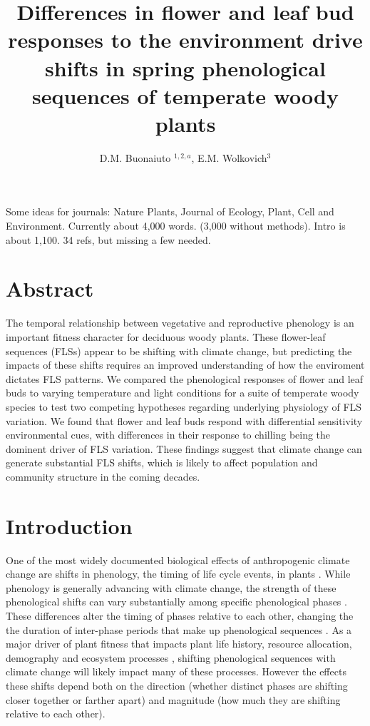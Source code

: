 \documentclass[11pt]{article}
\title{Differences in flower and leaf bud responses to the environment drive shifts in spring phenological sequences of temperate woody plants}\\
\date{}
\author{D.M. Buonaiuto $^{1,2,a}$, E.M. Wolkovich$^{3}$}
\begin{document}
\maketitle

Some ideas for journals: Nature Plants, Journal of Ecology, Plant, Cell and Environment. Currently about 4,000 words. (3,000 without methods). Intro is about 1,100. 34 refs, but missing a few needed. \\
\section*{Abstract}
The temporal relationship between vegetative and reproductive phenology is an important fitness character for deciduous woody plants. These flower-leaf sequences (FLSs) appear to be shifting with climate change, but predicting the impacts of these shifts requires an improved understanding of how the enviroment dictates FLS patterns. We compared the phenological responses of flower and leaf buds to varying temperature and light conditions for a suite of temperate woody species to test two competing hypotheses regarding underlying physiology of FLS variation. We found that flower and leaf buds respond with differential sensitivity environmental cues, with differences in their response to chilling being the dominent driver of FLS variation. These findings suggest that climate change can generate substantial FLS shifts, which is likely to affect population and community structure in the coming decades. %


\section*{Introduction}
\noindent One of the most widely documented biological effects of anthropogenic climate change are shifts in phenology, the timing of life cycle events, in plants \citep{Parmesan2003,Menzel2006,Cleland2007}. While phenology is generally advancing with climate change, the strength of these phenological shifts can vary substantially among specific phenological phases \citep{Augspurger:2020aa}. These differences alter the timing of phases relative to each other, changing the the duration of inter-phase periods that make up phenological sequences \citep{Ettinger2018}. As a major driver of plant fitness that impacts plant life history, resource allocation, demography and ecosystem processes \citep{Post:2008aa}, shifting phenological sequences with climate change will likely impact many of these processes. However the effects these shifts depend both on the direction (whether distinct phases are shifting closer together or farther apart) and magnitude (how much they are shifting relative to each other).\\ %
\end{document}
